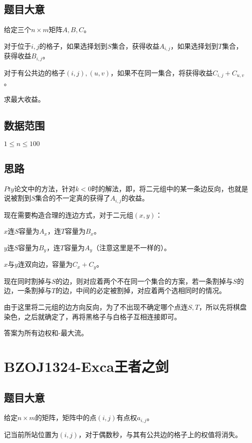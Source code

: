\documentclass{ctexart}
\numberwithin{equation}{section}
\begin{document}
\begin{flushleft}
  \subsection{题目大意}
  给定三个$n\times m$矩阵$A,B,C$。

  对于位于$i,j$的格子，如果选择划到$S$集合，获得收益$A_{i,j}$，如果选择划到$T$集合，获得收益$B_{i,j}$。

  对于有公共边的格子$(i,j),(u,v)$，如果不在同一集合，将获得收益$C_{i,j}+C_{u,v}$。

  求最大收益。
  
  \subsection{数据范围}
  $1\le n \le 100$
  
  \subsection{思路}
  $Pty$论文中的方法，针对$k < 0$时的解法，即，将二元组中的某一条边反向，也就是说被割到$S$集合的不一定真的获得了$A_{i,j}$的收益。

  现在需要构造合理的连边方式，对于二元组$(x,y)$：

  $x$连$S$容量为$A_x$，连$T$容量为$B_x$。

  $y$连$S$容量为$B_y$，连$T$容量为$A_y$（注意这里是不一样的）。

  $x$与$y$连双向边，容量为$C_x+C_y$。

  现在同时割掉与$S$的边，则对应着两个不在同一个集合的方案，若一条割掉与$S$的边，一条割掉与$T$的边，中间的必定被割掉，对应着两个选相同时的情况。

  由于这里将二元组的边方向反向，为了不出现不确定哪个点连$S,T$，所以先将棋盘染色，之后就确定了，再将黑格子与白格子互相连接即可。
  
  答案为所有边权和-最大流。

  \newpage

  \section{BZOJ1324-Exca王者之剑}
  \subsection{题目大意}
  给定$n\times m$的矩阵，矩阵中的点$(i,j)$有点权$a_{i,j}$。

  记当前所站位置为$(i,j)$，对于偶数秒，与其有公共边的格子上的权值将消失。


\end{flushleft}
\end{document}
